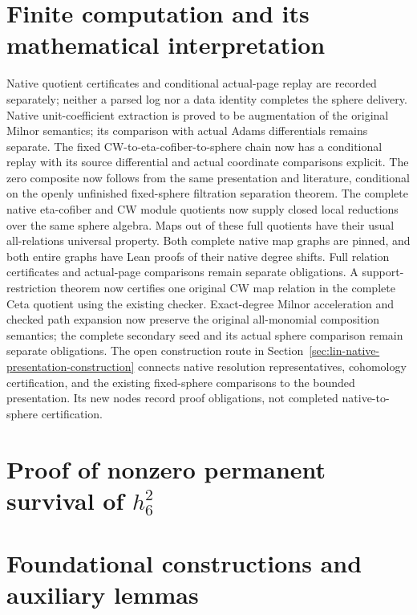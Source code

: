 \chapter{Finite computation and its mathematical interpretation}
\label{chap:finite-computation-main}
Native quotient certificates and conditional actual-page replay are recorded
separately; neither a parsed log nor a data identity completes the sphere delivery.
Native unit-coefficient extraction is proved to be augmentation of the original
Milnor semantics; its comparison with actual Adams differentials remains separate.
The fixed CW-to-eta-cofiber-to-sphere chain now has a conditional replay with
its source differential and actual coordinate comparisons explicit. The zero
composite now follows from the same presentation and literature, conditional
on the openly unfinished fixed-sphere filtration separation theorem.
The complete native eta-cofiber and CW module quotients now supply closed
local reductions over the same sphere algebra. Maps out of these full quotients
have their usual all-relations universal property. Both complete native map
graphs are pinned, and both entire graphs have Lean proofs of their native
degree shifts. Full relation certificates and actual-page comparisons remain
separate obligations. A support-restriction theorem now certifies one original
CW map relation in the complete Ceta quotient using the existing checker.
Exact-degree Milnor acceleration and checked path expansion now preserve the
original all-monomial composition semantics; the complete secondary seed and
its actual sphere comparison remain separate obligations.
The open construction route in
Section~\ref{sec:lin-native-presentation-construction} connects native
resolution representatives, cohomology certification, and the existing
fixed-sphere comparisons to the bounded presentation. Its new nodes record
proof obligations, not completed native-to-sphere certification.



\chapter{Proof of nonzero permanent survival of $h_6^2$}
\label{chap:near126-proof-main}





\appendix
\chapter{Foundational constructions and auxiliary lemmas}
\label{chap:mathematical-foundations-appendix}


